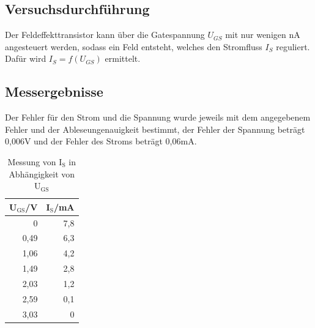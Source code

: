 \documentclass[12pt,a4paper]{article}
\begin{document}
\subsection{Versuchsdurchführung}
Der Feldeffekttransistor kann über die Gatespannung $U_{GS}$ mit nur wenigen \unit{nA} angesteuert werden, sodass ein Feld entsteht, welches den Stromfluss $I_S$ reguliert. Dafür wird $I_S = f(U_{GS})$ ermittelt.
\subsection{Messergebnisse}

Der Fehler für den Strom und die Spannung wurde jeweils mit dem angegebenem Fehler und der Ableseungenauigkeit bestimmt, der Fehler der Spannung beträgt 0,006V und der Fehler des Stroms beträgt 0,06mA.

\begin{table}[htbp]
\caption{Messung von I$_\text{S}$ in Abhängigkeit von U$_\text{GS}$}
\begin{center}
\begin{tabular}{|r|r|}
\hline
U$_\text{GS}$/V & I$_\text{S}$/mA \\ \hline
0 & 7,8 \\ \hline
0,49 & 6,3 \\ \hline
1,06 & 4,2 \\ \hline
1,49 & 2,8 \\ \hline
2,03 & 1,2 \\ \hline
2,59 & 0,1 \\ \hline
3,03 & 0 \\ \hline
\end{tabular}
\end{center}
\label{tab:a_4}
\end{table}
\end{document}
